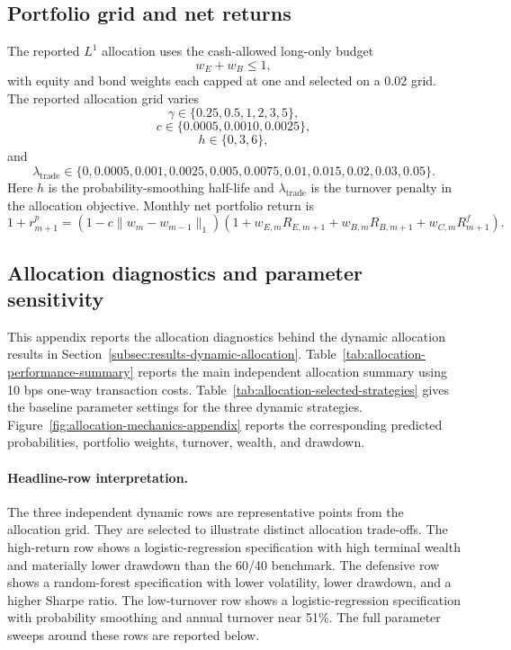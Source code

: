 \subsection{Portfolio grid and net returns}

The reported \(L^1\) allocation uses the cash-allowed long-only budget
\[
w_E+w_B\le 1,
\]
with equity and bond weights each capped at one and selected on a 0.02 grid. The reported
allocation grid varies
\[
\gamma\in\{0.25,0.5,1,2,3,5\},
\]
\[
c\in\{0.0005,0.0010,0.0025\},
\]
\[
h\in\{0,3,6\},
\]
and
\[
\lambda_{\mathrm{trade}}\in
\{0,0.0005,0.001,0.0025,0.005,0.0075,0.01,0.015,0.02,0.03,0.05\}.
\]
Here \(h\) is the probability-smoothing half-life and \(\lambda_{\mathrm{trade}}\) is the
turnover penalty in the allocation objective.
Monthly net portfolio return is
\begin{equation}
1+r^{p}_{m+1}
=
\left(1-c\|w_m-w_{m-1}\|_1\right)
\left(
1+w_{E,m}R_{E,m+1}+w_{B,m}R_{B,m+1}+w_{C,m}R^{f}_{m+1}
\right).
\end{equation}

\subsection{Allocation diagnostics and parameter sensitivity}
\label{app:allocation-diagnostics}

This appendix reports the allocation diagnostics behind the dynamic allocation results in Section~\ref{subsec:results-dynamic-allocation}. Table~\ref{tab:allocation-performance-summary} reports the main independent allocation summary using 10 bps one-way transaction costs. Table~\ref{tab:allocation-selected-strategies} gives the baseline parameter settings for the three dynamic strategies. Figure~\ref{fig:allocation-mechanics-appendix} reports the corresponding predicted probabilities, portfolio weights, turnover, wealth, and drawdown.





\paragraph{Headline-row interpretation.}
The three independent dynamic rows are representative points from the allocation grid.
They are selected to illustrate distinct allocation trade-offs. The high-return row shows a
logistic-regression specification with high terminal wealth and materially lower drawdown
than the 60/40 benchmark. The defensive row shows a random-forest specification with lower
volatility, lower drawdown, and a higher Sharpe ratio. The low-turnover row shows a
logistic-regression specification with probability smoothing and annual turnover near
51\%. The full parameter sweeps around these rows are reported below.

